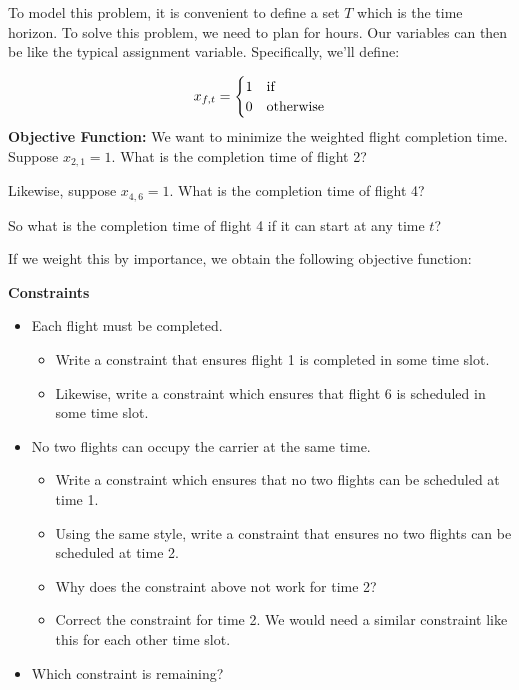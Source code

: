 \documentclass[11pt]{article}
\theoremstyle{definition}
\newcommand{\answerbox}[3]{%
  \fbox{%
    \begin{minipage}[#1]{#2}
      \hfill\vspace{#3}
    \end{minipage}
  }
}
\newcommand{\letterbox}{\answerbox{c}{.7cm}{.5cm}}
\begin{document}
To model this problem, it is convenient to define a set $T$ which is the time horizon. To solve this problem, we need to plan for \letterbox hours. Our variables can then be like the typical assignment variable. Specifically, we'll define:

\[
x_{f,t} = 
\begin{cases}
1 & \text{if \hfill} \\
0 & \text{otherwise}
\end{cases}
\]
\vfill
\newpage
\textbf{Objective Function:} We want to minimize the weighted flight completion time. Suppose $x_{2,1} = 1$. What is the completion time of flight 2? 

\vspace{0.25in}

Likewise, suppose $x_{4,6} = 1$. What is the completion time of flight 4? 

\vspace{0.25in}

So what is the completion time of flight 4 if it can start at any time $t$?

\vfill

If we weight this by importance, we obtain the following objective function:

\vfill

\textbf{Constraints}

\begin{itemize}
    \item Each flight must be completed. 
        \begin{itemize}
            \item Write a constraint that ensures flight 1 is completed in some time slot. \vfill
            \item Likewise, write a constraint which ensures that flight 6 is scheduled in some time slot. \vfill
        \end{itemize}
        \newpage
    \item No two flights can occupy the carrier at the same time.
        \begin{itemize}
            \item Write a constraint which ensures that no two flights can be scheduled at time 1. \vfill
            \item Using the same style, write a constraint that ensures no two flights can be scheduled at time 2. \vfill
            \item Why does the constraint above not work for time 2? \vspace{0.5in}
            \item Correct the constraint for time 2. We would need a similar constraint like this for each other time slot. \vfill
        \end{itemize}
    \item Which constraint is remaining? \vspace{0.5in}
    
\end{itemize}
\end{document}
